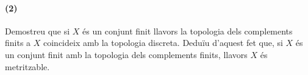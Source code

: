 \paragraph{(2)}
Demostreu que si $X$ és un conjunt finit llavors la topologia dels complements finits a $X$ coincideix amb la topologia discreta. Deduïu d'aquest fet que, si $X$ és un conjunt finit amb la topologia dels complements finits, llavors $X$ és metritzable.\\
